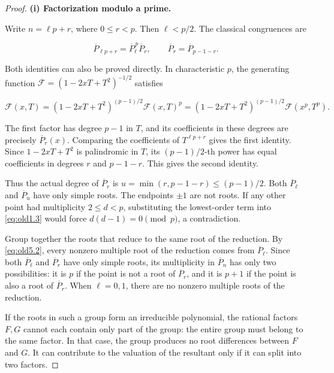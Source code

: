 \documentclass[11pt,a4paper]{article}
\numberwithin{equation}{section}
\theoremstyle{definition}
\begin{document}
\begin{proof}
\textbf{(i) Factorization modulo a prime.}

Write \(n=\ell p+r\), where \(0\le r<p\). Then \(\ell<p/2\). The classical congruences are \cite{cullinan,noe}

\begin{equation}
\overline P_{\ell p+r}=\overline P_{\ell}^{\,p}\overline P_r,
\qquad \overline P_r=\overline P_{p-1-r}.
\label{eq:old5.2}
\end{equation}

Both identities can also be proved directly. In characteristic \(p\), the generating function \(\mathcal F=(1-2xT+T^2)^{-1/2}\) satisfies

\[
\mathcal F(x,T)=(1-2xT+T^2)^{(p-1)/2}\mathcal F(x,T)^p
=(1-2xT+T^2)^{(p-1)/2}\mathcal F(x^p,T^p).
\]

The first factor has degree \(p-1\) in \(T\), and its coefficients in these degrees are precisely \(\overline P_r(x)\). Comparing the coefficients of \(T^{\ell p+r}\) gives the first identity. Since \(1-2xT+T^2\) is palindromic in \(T\), its \((p-1)/2\)-th power has equal coefficients in degrees \(r\) and \(p-1-r\). This gives the second identity.

Thus the actual degree of \(\overline P_r\) is \(u=\min(r,p-1-r)\le(p-1)/2\). Both \(\overline P_{\ell}\) and \(\overline P_u\) have only simple roots. The endpoints \(\pm1\) are not roots. If any other point had multiplicity \(2\le d<p\), substituting the lowest-order term into \eqref{eq:old1.3} would force \(d(d-1)=0\pmod p\), a contradiction.

Group together the roots that reduce to the same root of the reduction. By \eqref{eq:old5.2}, every nonzero multiple root of the reduction comes from \(\overline P_{\ell}\). Since both \(\overline P_{\ell}\) and \(\overline P_r\) have only simple roots, its multiplicity in \(\overline P_n\) has only two possibilities: it is \(p\) if the point is not a root of \(\overline P_r\), and it is \(p+1\) if the point is also a root of \(\overline P_r\). When \(\ell=0,1\), there are no nonzero multiple roots of the reduction.

If the roots in such a group form an irreducible polynomial, the rational factors \(F,G\) cannot each contain only part of the group: the entire group must belong to the same factor. In that case, the group produces no root differences between \(F\) and \(G\). It can contribute to the valuation of the resultant only if it can split into two factors.


\end{proof}
\end{document}
